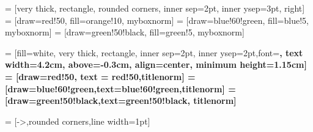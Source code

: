 = [very thick,
    rectangle, rounded corners, inner sep=2pt, inner ysep=3pt, right]
 = [draw=red!50, fill=orange!10, myboxnorm]
 = [draw=blue!60!green, fill=blue!5, myboxnorm]
 = [draw=green!50!black, fill=green!5, myboxnorm]

 = [fill=white, very thick,
    rectangle, inner sep=2pt, inner ysep=2pt,font=\bfseries,
    text width=4.2cm, above=-0.3cm, align=center,
    minimum height=1.15cm]
 = [draw=red!50, text = red!50,titlenorm]
 = [draw=blue!60!green,text=blue!60!green,titlenorm]
 = [draw=green!50!black,text=green!50!black, titlenorm]    

 = [->,rounded corners,line width=1pt]

